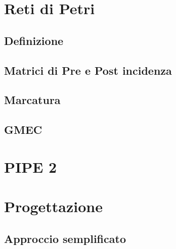 \chapter{Reti di Petri}
\label{cap:cap1}
\lhead{\textbf{\rightmark}}

\newpage

\section{Definizione}
\label{sec:1.1}

\newpage

\section{Matrici di Pre e Post incidenza}
\label{sec:1.2}

\newpage

\section{Marcatura}
\label{sec:1.3}

\newpage

\section{GMEC}
\label{sec:1.4}

\newpage


\chapter{PIPE 2}
\label{cap:cap2}
\lhead{\textbf{\rightmark}}

\newpage


\chapter{Progettazione}
\label{cap:cap3}
\lhead{\textbf{\rightmark}}

\newpage

\section{Approccio semplificato}
\label{sec:3.1}

\newpage